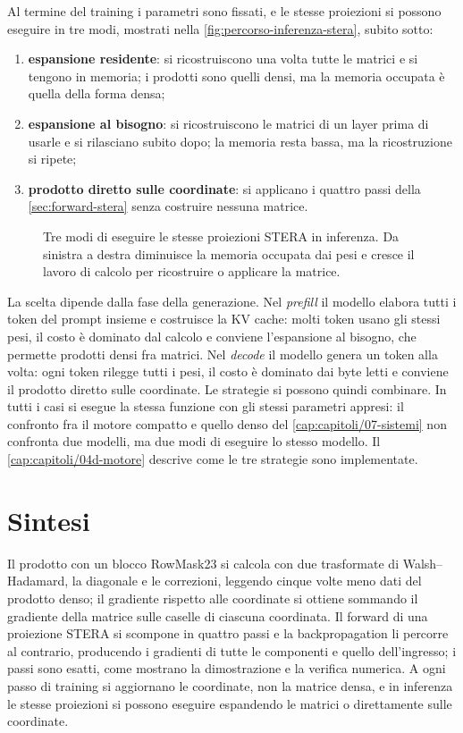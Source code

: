 Al termine del training i parametri sono fissati, e le stesse proiezioni si possono eseguire in tre modi, mostrati nella \autoref{fig:percorso-inferenza-stera}, subito sotto:
\begin{enumerate}
\item \textbf{espansione residente}: si ricostruiscono una volta tutte le matrici e si tengono in memoria; i prodotti sono quelli densi, ma la memoria occupata è quella della forma densa;
\item \textbf{espansione al bisogno}: si ricostruiscono le matrici di un layer prima di usarle e si rilasciano subito dopo; la memoria resta bassa, ma la ricostruzione si ripete;
\item \textbf{prodotto diretto sulle coordinate}: si applicano i quattro passi della \autoref{sec:forward-stera} senza costruire nessuna matrice.
\end{enumerate}

\begin{figure}[H]
\centering

\caption{Tre modi di eseguire le stesse proiezioni STERA in inferenza. Da sinistra a destra diminuisce la memoria occupata dai pesi e cresce il lavoro di calcolo per ricostruire o applicare la matrice.}
\label{fig:percorso-inferenza-stera}
\end{figure}

La scelta dipende dalla fase della generazione. Nel \emph{prefill} il modello elabora tutti i token del prompt insieme e costruisce la KV cache: molti token usano gli stessi pesi, il costo è dominato dal calcolo e conviene l'espansione al bisogno, che permette prodotti densi fra matrici. Nel \emph{decode} il modello genera un token alla volta: ogni token rilegge tutti i pesi, il costo è dominato dai byte letti e conviene il prodotto diretto sulle coordinate. Le strategie si possono quindi combinare. In tutti i casi si esegue la stessa funzione con gli stessi parametri appresi: il confronto fra il motore compatto e quello denso del \autoref{cap:capitoli/07-sistemi} non confronta due modelli, ma due modi di eseguire lo stesso modello. Il \autoref{cap:capitoli/04d-motore} descrive come le tre strategie sono implementate.


\section{Sintesi}

Il prodotto con un blocco RowMask23 si calcola con due trasformate di Walsh--Hadamard, la diagonale e le correzioni, leggendo cinque volte meno dati del prodotto denso; il gradiente rispetto alle coordinate si ottiene sommando il gradiente della matrice sulle caselle di ciascuna coordinata. Il forward di una proiezione STERA si scompone in quattro passi e la backpropagation li percorre al contrario, producendo i gradienti di tutte le componenti e quello dell'ingresso; i passi sono esatti, come mostrano la dimostrazione e la verifica numerica. A ogni passo di training si aggiornano le coordinate, non la matrice densa, e in inferenza le stesse proiezioni si possono eseguire espandendo le matrici o direttamente sulle coordinate.
